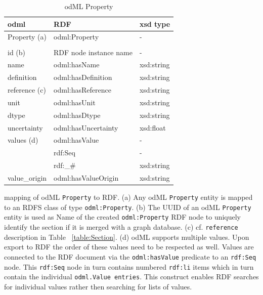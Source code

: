 \documentclass{article}
\begin{document}
\begin{table}
\begin{threeparttable}
\begin{tabular}{p{3.5cm}p{5cm}p{2cm}}
\toprule
    odml            & RDF                           & xsd type \\
\midrule
    Property (a)    & odml:Property                 & - \\
                    & & \\
    id (b)          & RDF node instance name        & - \\
    name            & odml:hasName                  & xsd:string \\
    definition      & odml:hasDefinition            & xsd:string \\
    reference (c)   & odml:hasReference             & xsd:string \\
    unit            & odml:hasUnit                  & xsd:string \\
    dtype           & odml:hasDtype                 & xsd:string \\
    uncertainty     & odml:hasUncertainty           & xsd:float \\
    values (d)      & odml:hasValue                 & - \\
                    & rdf:Seq                       & - \\
                    & rdf:\_\#                      & xsd:string \\
    value\_origin    & odml:hasValueOrigin           & xsd:string \\
\bottomrule
\end{tabular}
\caption{odML Property}
\begin{tablenotes}
\item mapping of odML \texttt{Property} to RDF. (a) Any odML \texttt{Property} entity is mapped to an RDFS class of type \texttt{odml:Property}. (b) The UUID of an odML \texttt{Property} entity is used as Name of the created \texttt{odml:Property} RDF node to uniquely identify the section if it is merged with a graph database. (c) cf. \texttt{reference} description in Table ~\ref{table:Section}. (d) odML supports multiple values. Upon export to RDF the order of these values need to be respected as well. Values are connected to the RDF document via the \texttt{odml:hasValue} predicate to an \texttt{rdf:Seq} node. This \texttt{rdf:Seq} node in turn contains numbered \texttt{rdf:li} items which in turn contain the individual \texttt{odml.Value entries}. This construct enables RDF searches for individual values rather then searching for lists of values.
\end{tablenotes}
\label{table:Property}
\end{threeparttable}
\end{table}
\end{document}
